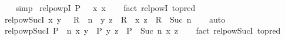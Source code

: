 \begin{isabellebody}
%
\isadelimproof
\ \ %
\endisadelimproof
%
\isatagproof
{}\isamarkupfalse%
\ simp%
\endisatagproof
{\isafoldproof}%
%
\isadelimproof
\isanewline
%
\endisadelimproof
\isanewline
{}\isamarkupfalse%
\ relpowp{\isacharunderscore}{\kern0pt}{}{\isacharunderscore}{\kern0pt}I{\isacharcolon}{\kern0pt}\ {\isachardoublequoteopen}{\isacharparenleft}{\kern0pt}P\ {\isacharcircum}{\kern0pt}{\isacharcircum}{\kern0pt}\ {}{\isacharparenright}{\kern0pt}\ x\ x{\isachardoublequoteclose}\isanewline
%
\isadelimproof
\ \ %
\endisadelimproof
%
\isatagproof
{}\isamarkupfalse%
\ {\isacharparenleft}{\kern0pt}fact\ relpow{\isacharunderscore}{\kern0pt}{}{\isacharunderscore}{\kern0pt}I\ {\isacharbrackleft}{\kern0pt}to{\isacharunderscore}{\kern0pt}pred{\isacharbrackright}{\kern0pt}{\isacharparenright}{\kern0pt}%
\endisatagproof
{\isafoldproof}%
%
\isadelimproof
\isanewline
%
\endisadelimproof
\isanewline
{}\isamarkupfalse%
\ relpow{\isacharunderscore}{\kern0pt}Suc{\isacharunderscore}{\kern0pt}I{\isacharcolon}{\kern0pt}\ {\isachardoublequoteopen}{\isacharparenleft}{\kern0pt}x{\isacharcomma}{\kern0pt}\ y{\isacharparenright}{\kern0pt}\ {\isasymin}\ \ R\ {\isacharcircum}{\kern0pt}{\isacharcircum}{\kern0pt}\ n\ {\isasymLongrightarrow}\ {\isacharparenleft}{\kern0pt}y{\isacharcomma}{\kern0pt}\ z{\isacharparenright}{\kern0pt}\ {\isasymin}\ R\ {\isasymLongrightarrow}\ {\isacharparenleft}{\kern0pt}x{\isacharcomma}{\kern0pt}\ z{\isacharparenright}{\kern0pt}\ {\isasymin}\ R\ {\isacharcircum}{\kern0pt}{\isacharcircum}{\kern0pt}\ Suc\ n{\isachardoublequoteclose}\isanewline
%
\isadelimproof
\ \ %
\endisadelimproof
%
\isatagproof
{}\isamarkupfalse%
\ auto%
\endisatagproof
{\isafoldproof}%
%
\isadelimproof
\isanewline
%
\endisadelimproof
\isanewline
{}\isamarkupfalse%
\ relpowp{\isacharunderscore}{\kern0pt}Suc{\isacharunderscore}{\kern0pt}I{\isacharcolon}{\kern0pt}\ {\isachardoublequoteopen}{\isacharparenleft}{\kern0pt}P\ {\isacharcircum}{\kern0pt}{\isacharcircum}{\kern0pt}\ n{\isacharparenright}{\kern0pt}\ x\ y\ {\isasymLongrightarrow}\ P\ y\ z\ {\isasymLongrightarrow}\ {\isacharparenleft}{\kern0pt}P\ {\isacharcircum}{\kern0pt}{\isacharcircum}{\kern0pt}\ Suc\ n{\isacharparenright}{\kern0pt}\ x\ z{\isachardoublequoteclose}\isanewline
%
\isadelimproof
\ \ %
\endisadelimproof
%
\isatagproof
{}\isamarkupfalse%
\ {\isacharparenleft}{\kern0pt}fact\ relpow{\isacharunderscore}{\kern0pt}Suc{\isacharunderscore}{\kern0pt}I\ {\isacharbrackleft}{\kern0pt}to{\isacharunderscore}{\kern0pt}pred{\isacharbrackright}{\kern0pt}{\isacharparenright}{\kern0pt}%

\end{isabellebody}
